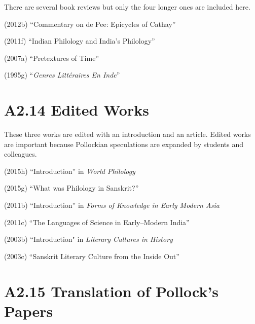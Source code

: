There are several book reviews but only the four longer ones are included here.

\item (2012b) “Commentary on de Pee: Epicycles of Cathay”

 \item (2011f) “Indian Philology and India’s Philology”

 \item (2007a) “Pretextures of Time”

 \item (1995g) “\textit{Genres Littéraires En Inde}”



\section*{A2.14 Edited Works}

These three works are edited with an introduction and an article. Edited works are important because Pollockian speculations are expanded by students and colleagues.

\item (2015h) “Introduction” in \textit{World Philology}

 \item (2015g) “What was Philology in Sanskrit?”

 \item (2011b) “Introduction” in \textit{Forms of Knowledge in Early Modern Asia}

 \item (2011c) “The Languages of Science in Early–Modern India”

 \item (2003b) “Introduction" in \textit{Literary Cultures in History}

 \item (2003c) “Sanskrit Literary Culture from the Inside Out”



\section*{A2.15 Translation of Pollock’s Papers}

